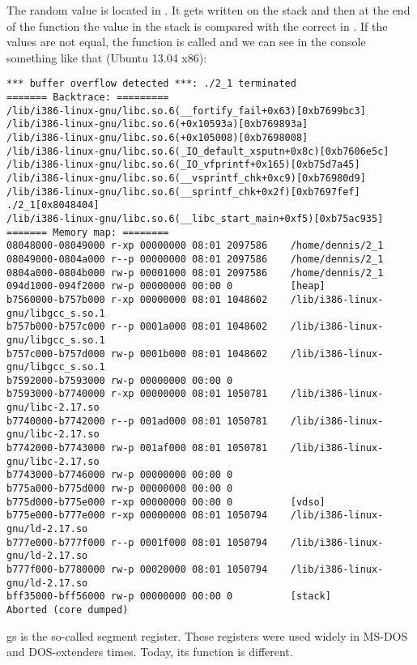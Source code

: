 

The random value is located in . 
It gets written on the stack and then at the end of the function
the value in the stack is compared with the correct  in . 
If the values are not equal, the 
function is called and we can see in the console something like that (Ubuntu 13.04 x86):

\begin{lstlisting}
*** buffer overflow detected ***: ./2_1 terminated
======= Backtrace: =========
/lib/i386-linux-gnu/libc.so.6(__fortify_fail+0x63)[0xb7699bc3]
/lib/i386-linux-gnu/libc.so.6(+0x10593a)[0xb769893a]
/lib/i386-linux-gnu/libc.so.6(+0x105008)[0xb7698008]
/lib/i386-linux-gnu/libc.so.6(_IO_default_xsputn+0x8c)[0xb7606e5c]
/lib/i386-linux-gnu/libc.so.6(_IO_vfprintf+0x165)[0xb75d7a45]
/lib/i386-linux-gnu/libc.so.6(__vsprintf_chk+0xc9)[0xb76980d9]
/lib/i386-linux-gnu/libc.so.6(__sprintf_chk+0x2f)[0xb7697fef]
./2_1[0x8048404]
/lib/i386-linux-gnu/libc.so.6(__libc_start_main+0xf5)[0xb75ac935]
======= Memory map: ========
08048000-08049000 r-xp 00000000 08:01 2097586    /home/dennis/2_1
08049000-0804a000 r--p 00000000 08:01 2097586    /home/dennis/2_1
0804a000-0804b000 rw-p 00001000 08:01 2097586    /home/dennis/2_1
094d1000-094f2000 rw-p 00000000 00:00 0          [heap]
b7560000-b757b000 r-xp 00000000 08:01 1048602    /lib/i386-linux-gnu/libgcc_s.so.1
b757b000-b757c000 r--p 0001a000 08:01 1048602    /lib/i386-linux-gnu/libgcc_s.so.1
b757c000-b757d000 rw-p 0001b000 08:01 1048602    /lib/i386-linux-gnu/libgcc_s.so.1
b7592000-b7593000 rw-p 00000000 00:00 0
b7593000-b7740000 r-xp 00000000 08:01 1050781    /lib/i386-linux-gnu/libc-2.17.so
b7740000-b7742000 r--p 001ad000 08:01 1050781    /lib/i386-linux-gnu/libc-2.17.so
b7742000-b7743000 rw-p 001af000 08:01 1050781    /lib/i386-linux-gnu/libc-2.17.so
b7743000-b7746000 rw-p 00000000 00:00 0
b775a000-b775d000 rw-p 00000000 00:00 0
b775d000-b775e000 r-xp 00000000 00:00 0          [vdso]
b775e000-b777e000 r-xp 00000000 08:01 1050794    /lib/i386-linux-gnu/ld-2.17.so
b777e000-b777f000 r--p 0001f000 08:01 1050794    /lib/i386-linux-gnu/ld-2.17.so
b777f000-b7780000 rw-p 00020000 08:01 1050794    /lib/i386-linux-gnu/ld-2.17.so
bff35000-bff56000 rw-p 00000000 00:00 0          [stack]
Aborted (core dumped)
\end{lstlisting}

gs is the so-called segment register. These registers were used widely in MS-DOS and DOS-extenders
times.
Today, its function is different.

